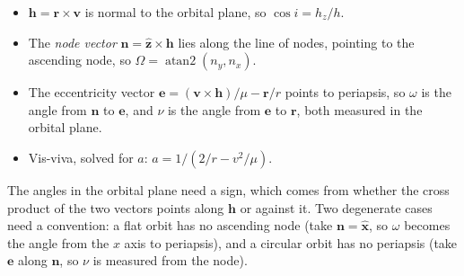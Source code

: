 \documentclass[
  10.5pt,
  letterpaper,
]{scrbook}
\providecommand{\tightlist}{%
  \setlength{\itemsep}{0pt}\setlength{\parskip}{0pt}}
\theoremstyle{plain}
\theoremstyle{remark}
\begin{document}
\begin{itemize}
\tightlist
\item
  \(\mathbf{h} = \mathbf{r}\times\mathbf{v}\) is normal to the orbital
  plane, so \(\cos i = h_z/h\).
\item
  The \emph{node vector}
  \(\mathbf{n} = \hat{\mathbf{z}}\times\mathbf{h}\) lies along the line
  of nodes, pointing to the ascending node, so
  \(\Omega = \operatorname{atan2}(n_y, n_x)\).
\item
  The eccentricity vector
  \(\mathbf{e} = (\mathbf{v}\times\mathbf{h})/\mu - \mathbf{r}/r\)
  points to periapsis, so \(\omega\) is the angle from \(\mathbf{n}\) to
  \(\mathbf{e}\), and \(\nu\) is the angle from \(\mathbf{e}\) to
  \(\mathbf{r}\), both measured in the orbital plane.
\item
  Vis-viva, solved for \(a\): \(a = 1/(2/r - v^2/\mu)\).
\end{itemize}

The angles in the orbital plane need a sign, which comes from whether
the cross product of the two vectors points along \(\mathbf{h}\) or
against it. Two degenerate cases need a convention: a flat orbit has no
ascending node (take \(\mathbf{n} = \hat{\mathbf{x}}\), so \(\omega\)
becomes the angle from the \(x\) axis to periapsis), and a circular
orbit has no periapsis (take \(\mathbf{e}\) along \(\mathbf{n}\), so
\(\nu\) is measured from the node).
\end{document}
